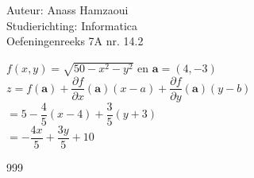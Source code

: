 \documentclass[a4paper]{article}
\begin{document}
  
\noindent \large Auteur: Anass Hamzaoui \\
\noindent \large Studierichting: Informatica\\
\noindent \large Oefeningenreeks 7A nr. 14.2\\

\medskip

\normalsize

$f(x,y)= \sqrt{50-x^{2} - y^{2}}$ en $\textbf{a} = (4,-3)$ \\

$z = f(\textbf{a}) + \dfrac{\partial f }{\partial x}(\textbf{a})(x-a) + \dfrac{\partial f}{\partial y}(\textbf{a})(y-b)$\\

$= 5-\dfrac{4}{5}(x-4)+\dfrac{3}{5}(y+3)$\\

$= -\dfrac{4x}{5} + \dfrac{3y}{5} + 10$ \\

\begin{thebibliography}{999}
\end{thebibliography}
\end{document}
